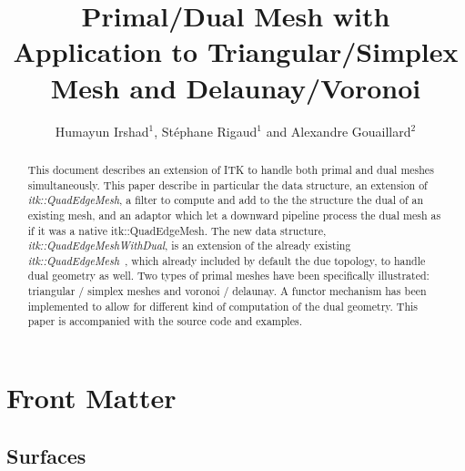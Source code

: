 \documentclass{InsightArticle}
\title{Primal/Dual Mesh with Application to Triangular/Simplex Mesh and Delaunay/Voronoi}
\author{Humayun Irshad$^{1}$, St\'{e}phane Rigaud$^{1}$ and Alexandre Gouaillard$^{2}$}
\newcommand{\IJhandlerIDnumber}{1338} %
\begin{document}
%
% 
\IJhandlefooter{\IJhandlerIDnumber}


\ifpdf
\else
\fi


\maketitle


\ifhtml
\chapter*{Front Matter\label{front}}
\fi


\begin{abstract}
\noindent
This document describes an extension of ITK to handle both primal and dual meshes simultaneously. This paper describe in particular the data structure, an extension of \emph{itk::QuadEdgeMesh}, a filter to compute and add to the the structure the dual of an existing mesh, and an adaptor which let a downward pipeline process the dual mesh as if it was a native itk::QuadEdgeMesh. The new data structure, \emph{itk::QuadEdgeMeshWithDual}, is an extension of the already existing \emph{itk::QuadEdgeMesh}~\cite{Gouaillard2006}, which already included by default the due topology, to handle dual geometry as well. Two types of primal meshes have been specifically illustrated: triangular / simplex meshes and voronoi / delaunay. A functor mechanism has been implemented to allow for different kind of computation of the dual geometry. This paper is accompanied with the source code and examples.
\end{abstract}
\IJhandlenote{\IJhandlerIDnumber}
\tableofcontents
\section{Surfaces}
\end{document}
